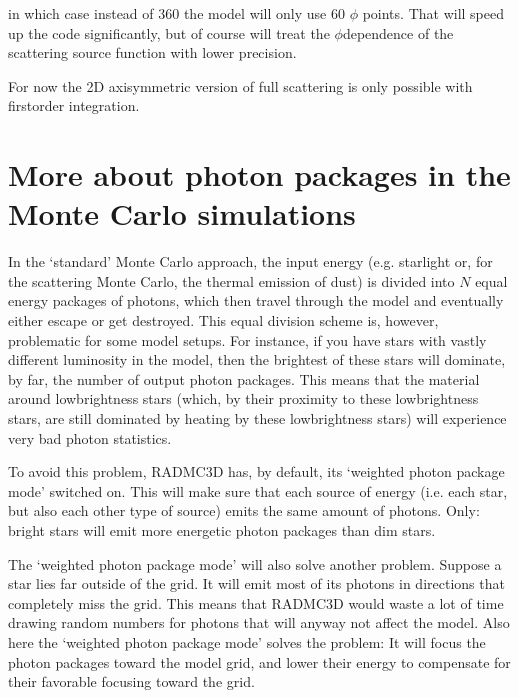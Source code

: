 \documentclass[letterpaper,10pt,english]{sphinxmanual}
\begin{document}
\begin{sphinxVerbatim}[commandchars=\\\{\}]
  
\end{sphinxVerbatim}

in which case instead of 360 the model will only use 60 \(\phi\)
points. That will speed up the code significantly, but of course will treat the
\(\phi\)\sphinxhyphen{}dependence of the scattering source function with lower precision.

For now the 2\sphinxhyphen{}D axisymmetric version of full scattering is only possible with
first\sphinxhyphen{}order integration.


\section{More about photon packages in the Monte Carlo simulations}
\label{\detokenize{dustradtrans:more-about-photon-packages-in-the-monte-carlo-simulations}}\label{\detokenize{dustradtrans:sec-photon-packages-mc}}
In the ‘standard’ Monte Carlo approach, the input energy (e.g. starlight or, for
the scattering Monte Carlo, the thermal emission of dust) is divided into
\(N\) equal energy packages of photons, which then travel through the model
and eventually either escape or get destroyed. This equal division scheme is,
however, problematic for some model setups. For instance, if you have stars with
vastly different luminosity in the model, then the brightest of these stars will
dominate, by far, the number of output photon packages.  This means that the
material around low\sphinxhyphen{}brightness stars (which, by their proximity to these
low\sphinxhyphen{}brightness stars, are still dominated by heating by these low\sphinxhyphen{}brightness
stars) will experience very bad photon statistics.

To avoid this problem, RADMC\sphinxhyphen{}3D has, by default, its ‘weighted photon package
mode’ switched on. This will make sure that each source of energy (i.e. each
star, but also each other type of source) emits the same amount of
photons. Only: bright stars will emit more energetic photon packages than dim
stars.

The ‘weighted photon package mode’ will also solve another problem.  Suppose a
star lies far outside of the grid. It will emit most of its photons in
directions that completely miss the grid. This means that RADMC\sphinxhyphen{}3D would waste a
lot of time drawing random numbers for photons that will anyway not affect the
model. Also here the ‘weighted photon package mode’ solves the problem: It will
focus the photon packages toward the model grid, and lower their energy to
compensate for their favorable focusing toward the grid.
\end{document}
